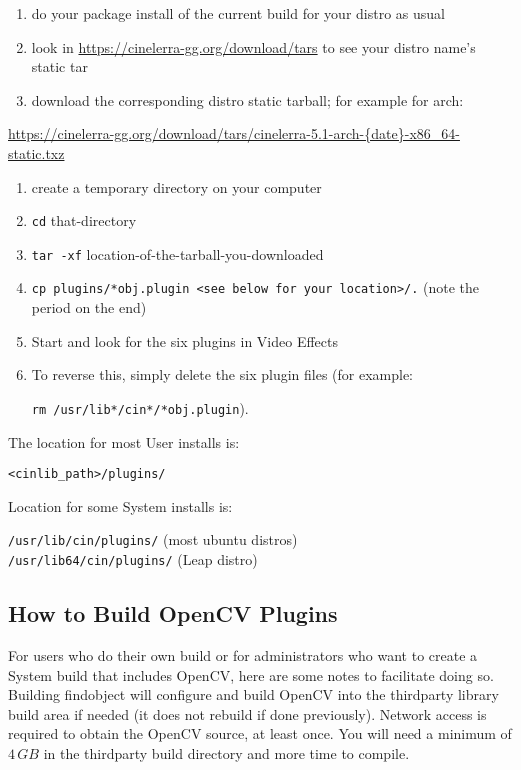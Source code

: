 \begin{enumerate}
    \item do your package install of the current build for your distro as usual
    \item look in {\small \url{https://cinelerra-gg.org/download/tars}} to see your distro name's static tar
    \item download the corresponding distro static tarball;
    for example for arch:
\end{enumerate}

    {\small \url{https://cinelerra-gg.org/download/tars/cinelerra-5.1-arch-{date}-x86_64-static.txz}}

\begin{enumerate}[resume]
    \item create a temporary directory on your computer
    \item \texttt{cd} that-directory
    \item \texttt{tar -xf} location-of-the-tarball-you-downloaded
    \item \texttt{cp plugins/*obj.plugin <see below for your location>/.} (note the period on the end)
    \item Start \CGG{} and look for the six plugins in Video Effects
    \item To reverse this, simply delete the six plugin files (for example:

    \texttt{rm /usr/lib*/cin*/*obj.plugin}).
\end{enumerate}

The location for most User installs is:

\hspace{4em}\texttt{<cinlib\_path>/plugins/}

Location for some System installs is:

\hspace{4em}\texttt{/usr/lib/cin/plugins/} (most ubuntu distros)\\
\hspace{4em}\texttt{/usr/lib64/cin/plugins/} (Leap distro)

\subsection{How to Build OpenCV Plugins}%
\label{sub:how_build_opencv_plugins}

For users who do their own build or for administrators who want to create a System build that
includes OpenCV, here are some notes to facilitate doing so.  Building findobject will configure
and build OpenCV into the thirdparty library build area if needed (it does not rebuild if done
previously).  Network access is required to obtain the OpenCV source, at least once. You will
need a minimum of $4\, GB$ in the thirdparty build directory and more time to compile.

